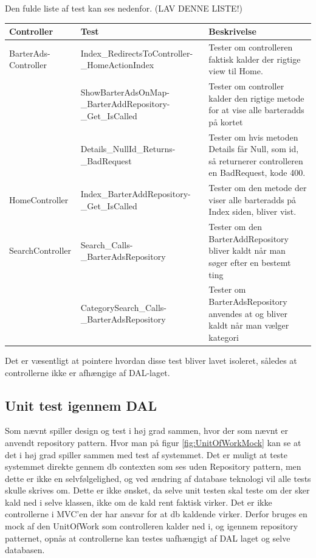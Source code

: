 Den fulde liste af test kan ses nedenfor.
(LAV DENNE LISTE!)
\setlength{\arrayrulewidth}{0.3mm}
\setlength{\tabcolsep}{2pt}
\renewcommand{\arraystretch}{1.5}
\begin{table}[H]
	\begin{tabular}{ | p{3.0cm} | p{5.5cm} | p{8.0cm} | }
		\hline
		\textbf{Controller} & \textbf{Test} & \textbf{Beskrivelse} \\
		\hline
		BarterAds-Controller &  Index\_RedirectsToController-\_HomeActionIndex & Tester om controlleren faktisk kalder der rigtige view til Home. \\
		
		& ShowBarterAdsOnMap-\_BarterAddRepository-\_Get\_IsCalled & Tester om controller kalder den rigtige metode for at vise alle barteradds på kortet\\
	
		& Details\_NullId\_Returns-\_BadRequest & Tester om hvis metoden Details får Null, som id, så returnerer controlleren en BadRequest, kode 400. \\
		\hline
		HomeController & Index\_BarterAddRepository-\_Get\_IsCalled & Tester om den metode der viser alle barteradds på Index siden, bliver vist. \\
		\hline
		SearchController & Search\_Calls-\_BarterAdsRepository & Tester om den BarterAddRepository bliver kaldt når man søger efter en bestemt ting \\
		& CategorySearch\_Calls-\_BarterAdsRepository & Tester om BarterAdsRepository anvendes at og bliver kaldt når man vælger kategori \\
		\hline
		
		
	\end{tabular}
\end{table}

Det er væsentligt at pointere hvordan disse test bliver lavet isoleret, således at controllerne ikke er afhængige af DAL-laget.

\subsection{Unit test igennem DAL}

Som nævnt spiller design og test i høj grad sammen, hvor der som nævnt er anvendt repository pattern. Hvor man på figur \ref{fig:UnitOfWorkMock} kan se at det i høj grad spiller sammen med test af systemmet. Det er muligt at teste systemmet direkte gennem db contexten som ses uden Repository pattern, men dette er ikke en selvfølgelighed, og ved ændring af database teknologi vil alle tests skulle skrives om. Dette er ikke ønsket, da selve unit testen skal teste om der sker kald ned i selve klassen, ikke om de kald rent faktisk virker. Det er ikke controllerne i MVC'en der har ansvar for at db kaldende virker. Derfor bruges en mock af den UnitOfWork som controlleren kalder ned i, og igennem repository patternet, opnås at controllerne kan testes uafhængigt af DAL laget og selve databasen.

